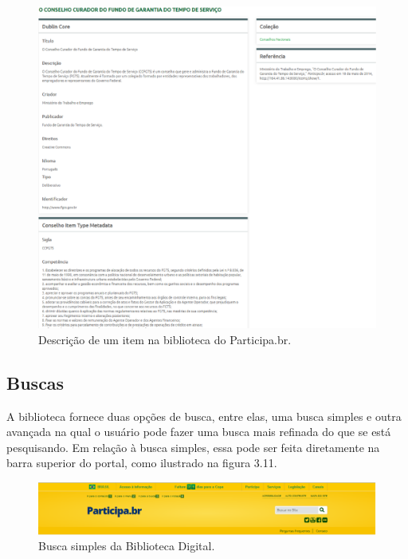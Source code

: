 \graphicspath{{figuras/prototipo/}}
\begin{figure}[H]
\centering
\includegraphics[width=1.0\textwidth]{descricao-item}
\caption{Descrição de um item na biblioteca do Participa.br.}
\label{fig:descricao_prototipo}
\end{figure}

\subsection*{Buscas}

A biblioteca fornece duas opções de busca, entre elas, uma busca simples e outra avançada na qual o usuário pode fazer uma busca mais refinada do que se está pesquisando.
Em relação à busca simples, essa pode ser feita diretamente na barra superior do portal, como ilustrado na figura 3.11.

\graphicspath{{figuras/prototipo/}}
\begin{figure}[H]
\centering
\includegraphics[width=1.0\textwidth]{cabecalho}
\caption{Busca simples da Biblioteca Digital.}
\label{fig:buscasimples_prototipo}
\end{figure}

